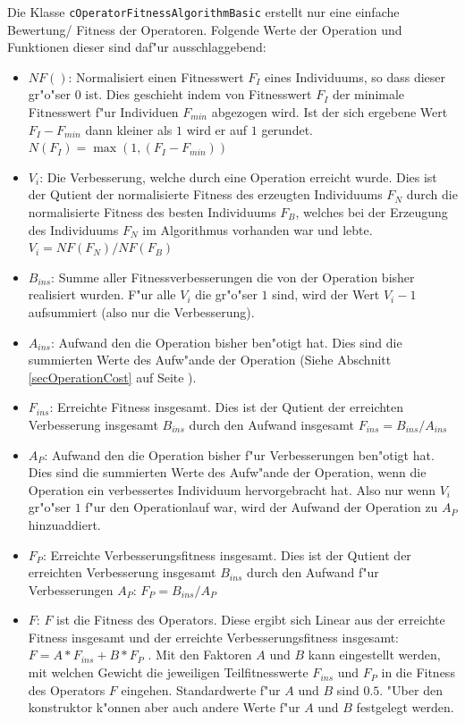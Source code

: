 Die Klasse \verb|cOperatorFitnessAlgorithmBasic| erstellt nur eine einfache Bewertung/ Fitness der Operatoren. Folgende Werte der Operation und Funktionen dieser sind daf"ur ausschlaggebend:
\begin{itemize}
 \item $NF()$: Normalisiert einen Fitnesswert $F_I$ eines Individuums, so dass dieser gr"o"ser $0$ ist. Dies geschieht indem von Fitnesswert $F_I$ der minimale Fitnesswert f"ur Individuen $F_{min}$ abgezogen wird. Ist der sich ergebene Wert $F_I - F_{min}$ dann kleiner als $1$ wird er auf $1$ gerundet. $N( F_I ) = \max( 1 , (F_I - F_{min}) )$
 \item $V_i$: Die Verbesserung, welche durch eine Operation erreicht wurde. Dies ist der Qutient der normalisierte Fitness des erzeugten Individuums $F_N$ durch die normalisierte Fitness des besten Individuums $F_B$, welches bei der Erzeugung des Individuums $F_N$ im Algorithmus vorhanden war und lebte. $V_i=NF( F_N )/NF( F_B )$
 \item $B_{ins}$: Summe aller Fitnessverbesserungen die von der Operation bisher realisiert wurden. F"ur alle $V_i$ die gr"o"ser $1$ sind, wird der Wert $V_i-1$ aufsummiert (also nur die Verbesserung).
 \item $A_{ins}$: Aufwand den die Operation bisher ben"otigt hat. Dies sind die summierten Werte des Aufw"ande der Operation (Siehe Abschnitt \ref{secOperationCost} auf Seite \pageref{secOperationCost}).
 \item $F_{ins}$: Erreichte Fitness insgesamt. Dies ist der Qutient der erreichten Verbesserung insgesamt $B_{ins}$ durch den Aufwand insgesamt $F_{ins}=B_{ins}/A_{ins}$
 \item $A_P$: Aufwand den die Operation bisher f"ur Verbesserungen ben"otigt hat. Dies sind die summierten Werte des Aufw"ande der Operation, wenn die Operation ein verbessertes Individuum hervorgebracht hat. Also nur wenn $V_i$ gr"o"ser $1$ f"ur den Operationlauf war, wird der Aufwand der Operation zu $A_P$ hinzuaddiert.
 \item $F_P$: Erreichte Verbesserungsfitness insgesamt. Dies ist der Qutient der erreichten Verbesserung insgesamt $B_{ins}$ durch den Aufwand f"ur Verbesserungen $A_{P}$: $F_{P}=B_{ins}/A_{P}$
 \item $F$: $F$ ist die Fitness des Operators. Diese ergibt sich Linear aus der erreichte Fitness insgesamt und der erreichte Verbesserungsfitness insgesamt: $F=A*F_{ins}+B*F_P$ . Mit den Faktoren $A$ und $B$ kann eingestellt werden, mit welchen Gewicht die jeweiligen Teilfitnesswerte $F_{ins}$ und $F_P$ in die Fitness des Operators $F$ eingehen. Standardwerte f"ur $A$ und $B$ sind $0.5$. "Uber den konstruktor k"onnen aber auch andere Werte f"ur $A$ und $B$ festgelegt werden.
\end{itemize}


